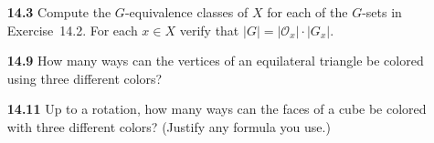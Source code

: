 \documentclass[12pt,reqno]{amsart}
\newcommand{\<}{\ensuremath{\langle}}
\renewcommand{\>}{\ensuremath{\rangle}}
\begin{document}
\begin{enumerate}
\begin{enumerate}
\end{enumerate}
 
 
\item[{\bf 14.3}]
Compute the $G$-equivalence classes of $X$ for each of the $G$-sets in
Exercise~14.2. For each $x \in X$ verify that 
$|G|=|{\mathcal O}_x| \cdot |G_x|$.  

\item[{\bf 14.9}]
How many ways can the vertices of an equilateral triangle be colored
using three different colors? 

\item[{\bf 14.11}]
Up to a rotation, how many ways can the faces of a cube be colored
with three different colors?  (Justify any formula you use.)
 
\end{enumerate}
\end{document}
